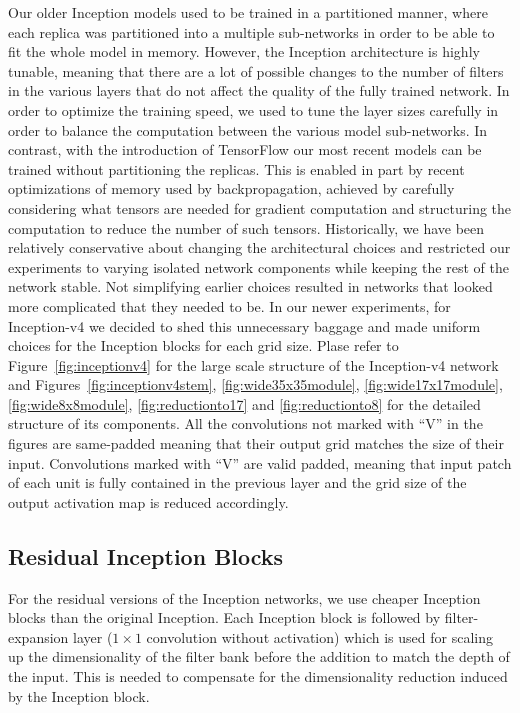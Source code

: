 \documentclass[10pt,twocolumn,letterpaper]{article}
\begin{document}
Our older Inception models used to be trained in a partitioned manner,
where each replica was partitioned into a multiple sub-networks in order to be able to
fit the whole model in memory. However, the Inception architecture is highly
tunable, meaning that there are a lot of possible changes to the number of filters
in the various layers that do not affect the quality of the fully trained
network. In order to optimize the training speed, we used to tune the layer sizes
carefully in order to balance the computation between the various model
sub-networks.
In contrast, with the introduction of TensorFlow our most recent models
can be trained without partitioning the replicas. This is enabled in part by recent
optimizations of memory used by backpropagation, achieved by carefully considering
what tensors are needed for gradient computation and structuring the computation
to reduce the number of such tensors. Historically, we have been
relatively conservative about changing the architectural choices and restricted
our experiments to varying isolated network components while keeping the
rest of the network stable. Not simplifying earlier choices
resulted in networks that looked more complicated that they needed to be.
In our newer experiments, for Inception-v4 we decided to shed this unnecessary
baggage and made uniform choices for the Inception blocks for each grid size.
Plase refer to Figure~\ref{fig:inceptionv4} for the large scale
structure of the Inception-v4 network and Figures~\ref{fig:inceptionv4stem},
\ref{fig:wide35x35module}, \ref{fig:wide17x17module}, \ref{fig:wide8x8module},
\ref{fig:reductionto17} and \ref{fig:reductionto8} for the detailed structure
of its components. All the convolutions not marked with ``V'' in the figures
are same-padded meaning that their output grid matches the size of their input.
Convolutions marked with ``V'' are valid padded, meaning that input patch of
each unit is fully contained in the previous layer and the grid size of the
output activation map is reduced accordingly.

\subsection{Residual Inception Blocks}
For the residual versions of the Inception networks, we use cheaper Inception
blocks than the original Inception. Each Inception block is followed by
filter-expansion layer ($1\times 1$ convolution without activation) which is
used for scaling up the dimensionality of the filter bank before the addition
to match the depth of the input. This is needed to compensate for the dimensionality
reduction induced by the Inception block.
\end{document}

